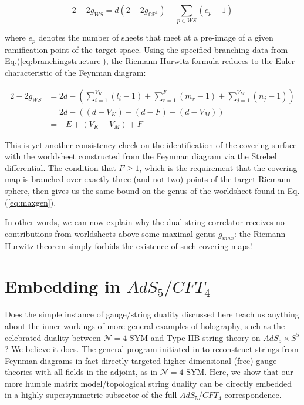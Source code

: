 \documentclass[english]{article}
\renewcommand{\>}{\rangle}
\newcommand{\<}{\langle}
\renewcommand{\(}{\left(}
\renewcommand{\)}{\right)}
\begin{document}
\begin{equation}
    2-2g_{WS}= d(2-2g_{\mathbb{CP}^1}) - \sum_{p\in WS}(e_{p}-1)
\end{equation}

where $e_p$ denotes the number of sheets that meet at a pre-image of a given ramification point of the target space. Using the specified branching data from Eq.(\ref{eq:branchingstructure}), the Riemann-Hurwitz formula reduces to the Euler characteristic of the Feynman diagram: 

\begin{align}
2-2g_{WS}  & = 2d - \left( \sum_{i=1}^{V_{K}} (l_{i} - 1) + \sum_{r=1}^{F} (m_{r}-1) + \sum_{j=1}^{V_{M}} (n_{j}-1) \right) \\
  & =    2d - \left( (d - V_{K}) + (d-F) + (d-V_{M}) \right) \\
  & =  -E + (V_{K}+V_{M})+F
\end{align} 

This is yet another consistency check on the identification of the covering surface with the worldsheet constructed from the Feynman diagram via the Strebel differential. The condition that $F \geq 1$, which is the requirement that the covering map is branched over exactly three (and not two) points of the target Riemann sphere, then gives us the same bound on the genus of the worldsheet found in Eq.(\ref{eq:maxgen}).

In other words, we can now explain why the dual string correlator receives no contributions from worldsheets above some maximal genus $g_{max}$: the Riemann-Hurwitz theorem simply forbids the existence of such covering maps! 


\pagebreak

\section{Embedding in $AdS_{5}/CFT_{4}$} \label{sec:embedding}

Does the simple instance of gauge/string duality discussed here teach us anything about the inner workings of more general examples of holography, such as the celebrated duality between $\mathcal{N}=4$ SYM and Type IIB string theory on $AdS_{5} \times S^{5}$? We believe it does. The general program initiated in \cite{freefieldsadsI,freefieldsadsII,freefieldsIII} to reconstruct strings from Feynman diagrams in fact directly targeted higher dimensional (free) gauge theories with all fields in the adjoint, as in $\mathcal{N}=4$ SYM. Here, we show that our more humble matrix model/topological string duality can be directly embedded in a highly supersymmetric subsector of the full $AdS_{5}/CFT_{4}$ correspondence. 
\end{document}
